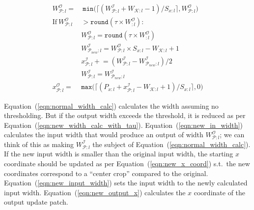 \begin{align}
\label{eqn:normal_width_calc}
W^\mathcal{O}_{\mathcal{P}:l} = &~ \texttt{min}\big(\lceil (W^\mathcal{I}_{\mathcal{P}:l} + W_{\mathcal{K}:l} - 1)/S_{x:l} \rceil, W^\mathcal{O}_{\mathcal{P}:l}\big)\\
\label{eqn:check_tau}
\text{If}~ W_{\mathcal{P}:l}^\mathcal{O} & > \texttt{round}(\tau \times W^\mathcal{O}_{:l}):\\
\label{eqn:new_width_calc_with_tau}
& W^\mathcal{O}_{\mathcal{P}:l} = \texttt{round}(\tau \times W^\mathcal{O}_{:l})\\
\label{eqn:new_in_width}
& W^\mathcal{I}_{\mathcal{P}_{new}:l} = W^\mathcal{O}_{\mathcal{P}:l} \times S_{x:l} - W_{\mathcal{K}:l} + 1\\
\label{eqn:new_x_coord}
& x^{\mathcal{I}}_{\mathcal{P}:l} \mathrel{+}= (W^\mathcal{I}_{\mathcal{P}:l} - W^\mathcal{I}_{\mathcal{P}_{new}:l})/2\\
\label{eqn:new_input_width}
& W^\mathcal{I}_{\mathcal{P}:l} = W^\mathcal{I}_{\mathcal{P}_{new}:l}\\
\label{eqn:new_output_x}
x^\mathcal{O}_{\mathcal{P}:l} = & \texttt{max}\big(\lceil (P_{x:l} + x^\mathcal{I}_{\mathcal{P}:l} - W_{\mathcal{K}:l} + 1)/S_{x:l} \rceil, 0\big)
\end{align}

Equation~(\ref{eqn:normal_width_calc}) calculates the width assuming no thresholding. But if the output width exceeds the threshold, it is reduced as per Equation~(\ref{eqn:new_width_calc_with_tau}). Equation~(\ref{eqn:new_in_width}) calculates the input width that would produce an output of width $W^\mathcal{O}_{\mathcal{P}:l}$; we can think of this as making $W^{\mathcal{I}}_{\mathcal{P}:l}$ the subject of Equation~(\ref{eqn:normal_width_calc}). If the new input width is smaller than the original input width, the starting $x$ coordinate should be updated as per Equation~(\ref{eqn:new_x_coord}) s.t.~the new coordinates correspond to a ``center crop'' compared to the original. Equation~(\ref{eqn:new_input_width}) sets the input width to the newly calculated input width. Equation~(\ref{eqn:new_output_x}) calculates the $x$ coordinate of the output update patch.

